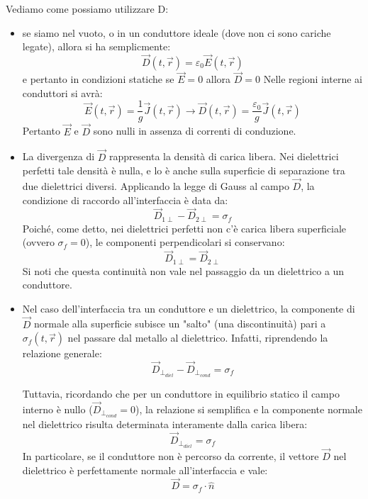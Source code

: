 \documentclass{book}
\begin{document}
Vediamo come possiamo utilizzare D: 
\begin{itemize}
    \item se siamo nel vuoto, o in un conduttore ideale (dove non ci sono cariche legate), allora si ha semplicmente: 
    $$
    \vec{D}(t,\vec{r}) = \varepsilon_0 \vec{E}(t,\vec{r})
    $$
    e pertanto in condizioni statiche se $\vec{E}= 0$ allora $\vec{D}=0$
    Nelle regioni interne ai conduttori si avrà:
    $$
    \vec{E}(t,\vec{r}) = \frac{1}{g}\vec{J}(t,\vec{r})
    \to \vec{D}(t,\vec{r}) = \frac{\varepsilon_0}{g} \vec{J}(t,\vec{r})
    $$ 
    Pertanto $\vec{E}$ e $\vec{D}$ sono nulli in assenza di correnti di conduzione.    
    
    \item La divergenza di $\vec{D}$ rappresenta la densità di carica libera. Nei dielettrici perfetti tale densità è nulla, e lo è anche sulla superficie di separazione tra due dielettrici diversi. Applicando la legge di Gauss al campo $\vec{D}$, la condizione di raccordo all'interfaccia è data da:
    $$
    \vec{D}_{1 \perp} - \vec{D}_{2 \perp} = \sigma_f 
    $$
    Poiché, come detto, nei dielettrici perfetti non c'è carica libera superficiale (ovvero $\sigma_f=0$), le componenti perpendicolari si conservano:
    $$
    \vec{D}_{1\perp}= \vec{D}_{2\perp}
    $$
    Si noti che questa continuità non vale nel passaggio da un dielettrico a un conduttore.

    \item Nel caso dell'interfaccia tra un conduttore e un dielettrico, la componente di $\vec{D}$ normale alla superficie subisce un "salto" (una discontinuità) pari a $\sigma_f(t,\vec{r})$ nel passare dal metallo al dielettrico. Infatti, riprendendo la relazione generale: 
    $$
    \vec{D}_{\perp_{diel}} - \vec{D}_{\perp_{cond}} = \sigma_f 
    $$

    
    
     Tuttavia, ricordando che per un conduttore in equilibrio statico il campo interno è nullo ($\vec{D}_{\perp_{cond}}=0$), la relazione si semplifica e la componente normale nel dielettrico risulta determinata interamente dalla carica libera:
    $$
    \vec{D}_{\perp_{diel}} = \sigma_f
    $$
    In particolare, se il conduttore non è percorso da corrente, il vettore $\vec{D}$ nel dielettrico è perfettamente normale all'interfaccia e vale:
    $$
    \vec{D} = \sigma_f \cdot \hat{n}
    $$
\end{itemize}
\end{document}
